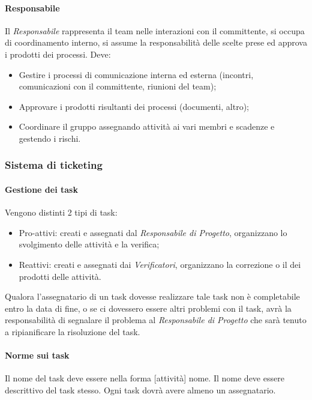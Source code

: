\paragraph{Responsabile} \Spazio
Il \emph{Responsabile} rappresenta il team nelle interazioni con il committente, si occupa di coordinamento interno, si assume la responsabilità delle scelte prese ed approva i prodotti dei processi. Deve:
\begin{itemize}
\item Gestire i processi di comunicazione interna ed esterna (incontri, comunicazioni con il committente, riunioni del team);
\item Approvare i prodotti risultanti dei processi (documenti, altro);
\item Coordinare il gruppo assegnando attività ai vari membri e scadenze e gestendo i rischi.
\end{itemize}

\subsubsection{Sistema di ticketing}

\paragraph{Gestione dei task} \Spazio
Vengono distinti 2 tipi di task:
\begin{itemize}
\item Pro-attivi: creati e assegnati dal \emph{Responsabile di Progetto}, organizzano lo svolgimento delle attività e la verifica;
\item Reattivi: creati e assegnati dai \emph{Verificatori}, organizzano la correzione o il  dei prodotti delle attività.
\end{itemize}
Qualora l'assegnatario di un task dovesse realizzare tale task non è completabile entro la data di fine, o se ci dovessero essere altri problemi con il task, avrà la responsabilità di segnalare il problema al \emph{Responsabile di Progetto} che sarà tenuto a ripianificare la risoluzione del task.

\paragraph{Norme sui task} \Spazio
Il nome del task deve essere nella forma [attività] nome. Il nome deve essere descrittivo del task stesso. Ogni task dovrà avere almeno un assegnatario.

